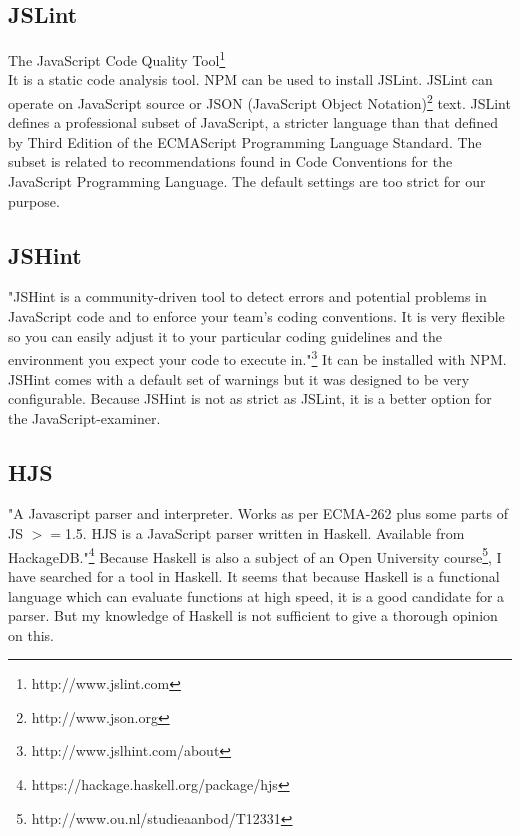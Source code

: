 \documentclass{article}
\begin{document}
\subsection{JSLint}
The JavaScript Code Quality Tool\footnote{http://www.jslint.com}\\
It is a static code analysis tool.
NPM can be used to install JSLint.
JSLint can operate on JavaScript source or JSON (JavaScript Object Notation)\footnote {http://www.json.org} text.
JSLint defines a professional subset of JavaScript, a stricter language than that 
defined by Third Edition of the ECMAScript Programming Language Standard.
The subset is related to recommendations found in Code Conventions for the JavaScript Programming Language.
The default settings are too strict for our purpose.

\subsection{JSHint}
"JSHint is a community-driven tool to detect errors and potential problems in JavaScript code and to enforce your team's coding conventions. It is very flexible so you can easily adjust it to your particular coding guidelines and the environment you expect your code to execute in."\footnote{http://www.jslhint.com/about}
It can be installed with NPM.
JSHint comes with a default set of warnings but it was designed to be very configurable.
Because JSHint is not as strict as JSLint, it is a better option for the JavaScript-examiner.

\subsection{HJS}
"A Javascript parser and interpreter. Works as per ECMA-262 plus some parts of JS $>=$1.5.
HJS is a JavaScript parser written in Haskell. Available from HackageDB."\footnote{https://hackage.haskell.org/package/hjs}
Because Haskell is also a subject of an Open University course\footnote{http://www.ou.nl/studieaanbod/T12331}, I have searched for a tool in Haskell.
It seems that because Haskell is a functional language which can evaluate functions at high speed, it is a good candidate for a parser.
But my knowledge of Haskell is not sufficient to give a thorough opinion on this.

\end{document}
